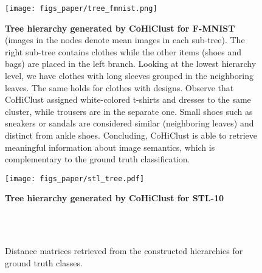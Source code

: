 \documentclass[runningheads]{llncs}
\def\our{CoHiClust}
\begin{document}
\begin{figure}[!htb]
    \centering
    \texttt{[image: figs\_paper/tree\_fmnist.png]}
    \caption{{\bf Tree hierarchy generated by \our{} for F-MNIST} (images in the nodes denote mean images in each sub-tree). The right sub-tree contains clothes while the other items (shoes and bags) are placed in the left branch. Looking at the lowest hierarchy level, we have clothes with long sleeves grouped in the neighboring leaves. The same holds for clothes with designs. Observe that \our{} assigned white-colored t-shirts and dresses to the same cluster, while trousers are in the separate one. Small shoes such as sneakers or sandals are considered similar (neighboring leaves) and distinct from ankle shoes. Concluding, \our{} is able to retrieve meaningful information about image semantics, which is complementary to the ground truth classification.}
    \label{fig:fmnist}
\end{figure}

\begin{figure}
    \centering
    \texttt{[image: figs\_paper/stl\_tree.pdf]}
    \caption{{\bf Tree hierarchy generated by \our{} for STL-10}}
    \label{fig:stl10}
\end{figure}


\begin{figure}[!ht]
    \centering
    \\
    \\
    \caption{Distance matrices retrieved from the constructed hierarchies for ground truth classes.}
    \label{fig:dist2}
\end{figure}
\end{document}
